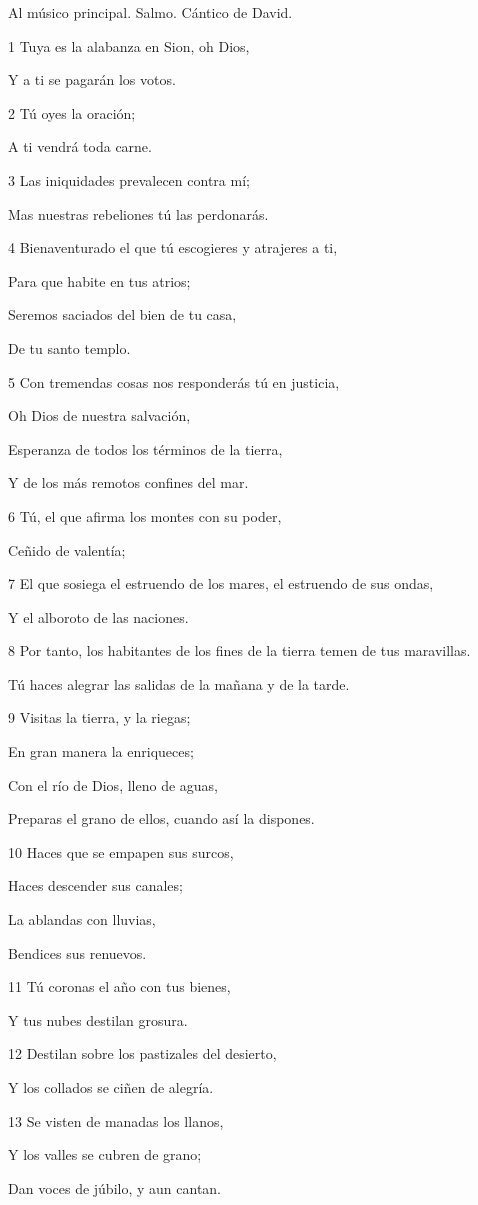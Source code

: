 \par Al músico principal. Salmo. Cántico de David.

\par 1 Tuya es la alabanza en Sion, oh Dios,
\par Y a ti se pagarán los votos.
\par 2 Tú oyes la oración;
\par A ti vendrá toda carne.
\par 3 Las iniquidades prevalecen contra mí;
\par Mas nuestras rebeliones tú las perdonarás.
\par 4 Bienaventurado el que tú escogieres y atrajeres a ti,
\par Para que habite en tus atrios;
\par Seremos saciados del bien de tu casa,
\par De tu santo templo.
\par 5 Con tremendas cosas nos responderás tú en justicia,
\par Oh Dios de nuestra salvación,
\par Esperanza de todos los términos de la tierra,
\par Y de los más remotos confines del mar.
\par 6 Tú, el que afirma los montes con su poder,
\par Ceñido de valentía;
\par 7 El que sosiega el estruendo de los mares, el estruendo de sus ondas,
\par Y el alboroto de las naciones.
\par 8 Por tanto, los habitantes de los fines de la tierra temen de tus maravillas.
\par Tú haces alegrar las salidas de la mañana y de la tarde.
\par 9 Visitas la tierra, y la riegas;
\par En gran manera la enriqueces;
\par Con el río de Dios, lleno de aguas,
\par Preparas el grano de ellos, cuando así la dispones.
\par 10 Haces que se empapen sus surcos,
\par Haces descender sus canales;
\par La ablandas con lluvias,
\par Bendices sus renuevos.
\par 11 Tú coronas el año con tus bienes,
\par Y tus nubes destilan grosura.
\par 12 Destilan sobre los pastizales del desierto,
\par Y los collados se ciñen de alegría.
\par 13 Se visten de manadas los llanos,
\par Y los valles se cubren de grano;
\par Dan voces de júbilo, y aun cantan.

